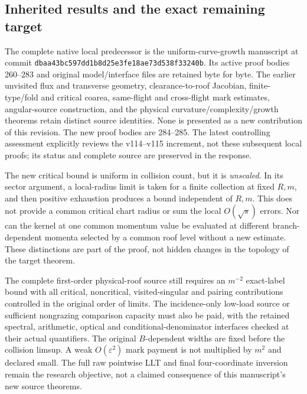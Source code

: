 \documentclass[11pt,reqno]{amsart}
\numberwithin{equation}{section}
\theoremstyle{definition}\newtheorem{definition}[theorem]{Definition}
\theoremstyle{remark}\newtheorem{remark}[theorem]{Remark}
\begin{document}
\subsection*{Inherited results and the exact remaining target}
The complete native local predecessor is the uniform-curve-growth
manuscript at commit \texttt{dbaa43bc597dd1b8d25e3fe18ae73d538f33240b}.
Its active proof bodies 260--283 and original model/interface files are
retained byte for byte. The earlier unvisited flux and transverse geometry,
clearance-to-roof Jacobian, finite-type/fold and critical coarea, same-flight
and cross-flight mark estimates, angular-source construction, and the
physical curvature/complexity/growth theorems retain distinct source
identities. None is presented as a new contribution of this revision.
The new proof bodies are 284--285. The latest controlling assessment
explicitly reviews the v114--v115 increment, not these subsequent local
proofs; its status and complete source are preserved in the response.

The new critical bound is uniform in collision count, but it is
\emph{unscaled}. In its sector argument, a local-radius limit is taken
for a finite collection at fixed $R,m$, and then positive exhaustion
produces a bound independent of $R,m$. This does not provide a common
critical chart radius or sum the local $O(\sqrt s)$ errors. Nor can the
kernel at one common momentum value be evaluated at different
branch-dependent momenta selected by a common roof level without a new
estimate. These distinctions are part of the proof, not hidden changes
in the topology of the target theorem.

The complete first-order physical-roof source still requires an
$m^{-2}$ exact-label bound with all critical, noncritical, visited-singular
and pairing contributions controlled in the original order of limits.
The incidence-only low-load source or sufficient nongrazing comparison
capacity must also be paid, with the retained spectral, arithmetic,
optical and conditional-denominator interfaces checked at their actual
quantifiers. The original $B$-dependent widths are fixed before the
collision limsup. A weak $O(\varepsilon^2)$ mark payment is not multiplied
by $m^2$ and declared small. The full raw pointwise LLT and final
four-coordinate inversion remain the research objective, not a claimed
consequence of this manuscript's new source theorems.
\end{document}
